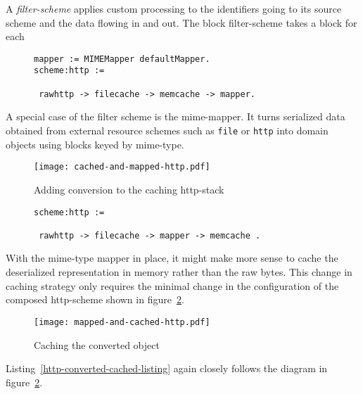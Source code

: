 \documentclass[preprint,authoryear]{acm_proc_article-sp}
\begin{document}
A {\em filter-scheme} applies custom processing to the identifiers going to
its source scheme and the data flowing in and out.  The block filter-scheme
takes a block for each 

\begin{figure}[htbp]
\begin{lstlisting}[style=L,label=http-cached-converted-listing,caption=Caching and converting.]
mapper := MIMEMapper defaultMapper.
scheme:http := 

 rawhttp -> filecache -> memcache -> mapper.
\end{lstlisting}
\end{figure}


 A special case of the 
filter scheme is the mime-mapper.  It turns serialized data obtained from
external resource schemes such as {\tt file} or {\tt http} into domain objects
using blocks keyed by mime-type.  

\begin{figure}[htbp]
\caption{Adding conversion to the caching http-stack}
\label{http-cached-converted}
\begin{center}
\texttt{[image: cached-and-mapped-http.pdf]}
\end{center}
\end{figure}

\begin{figure}[htbp]
\begin{lstlisting}[style=L,label=http-cached-converted-listing,caption=Converting and caching.]
scheme:http := 

 rawhttp -> filecache -> mapper -> memcache .
\end{lstlisting}
\end{figure}


With the mime-type mapper in place, it might make more sense to
cache the deserialized representation in memory rather than
the raw bytes.  This change in caching strategy only requires
the minimal change in the configuration of the composed http-scheme
shown in figure~\ref{http-converted-cached}.

\begin{figure}[htbp]
\caption{Caching the converted object}
\label{http-converted-cached}
\begin{center}
\texttt{[image: mapped-and-cached-http.pdf]}
\end{center}
\end{figure}

Listing~\ref{http-converted-cached-listing} again closely follows the
diagram in figure~\ref{http-converted-cached}.
\end{document}
